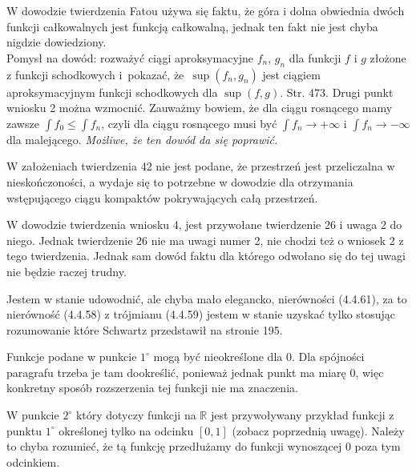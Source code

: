 \documentclass[a4paper,11pt]{article}
\begin{document}
\start {} W dowodzie twierdzenia Fatou używa się faktu, że góra
i dolna obwiednia dwóch funkcji całkowalnych jest funkcją
całkowalną, jednak ten fakt nie jest chyba nigdzie dowiedziony.\\
Pomysł na dowód: rozważyć ciągi aproksymacyjne $f_{ n }$, $g_{ n }$
dla funkcji $f$ i $g$ złożone z funkcji schodkowych i~pokazać,
że~$\sup( f_{ n }, g_{ n } )$ jest ciągiem aproksymacyjnym funkcji
schodkowych dla $\sup( f, g )$. \start Str. 473. Drugi punkt wniosku 2
można wzmocnić. Zauważmy bowiem, że dla ciągu rosnącego mamy zawsze
$\int f_{ 0 } \leq \int f_{ n }$, czyli dla ciągu rosnącego musi być
$\int f_{ n } \to +\infty$ i $\int f_{ n } \to -\infty$ dla
malejącego. \emph{Możliwe, że ten dowód da się poprawić.}

\vspace{\spaceFour}


\start {} W założeniach twierdzenia 42 nie jest podane, że
przestrzeń jest przeliczalna w nieskończoności, a wydaje się to
potrzebne w dowodzie dla otrzymania wstępującego ciągu kompaktów
pokrywających całą przestrzeń.

\vspace{\spaceFour}


\start {} W dowodzie twierdzenia wniosku 4, jest przywołane
twierdzenie 26 i uwaga 2 do niego. Jednak twierdzenie 26 nie ma uwagi
numer 2, nie chodzi też o wniosek 2 z tego twierdzenia. Jednak sam
dowód faktu dla którego odwołano się do tej uwagi nie będzie raczej
trudny.

\vspace{\spaceFour}


\start {} Jestem w stanie udowodnić, ale chyba mało elegancko,
nierówności (4.4.61), za to nierówność (4.4.58) z trójmianu (4.4.59)
jestem w stanie uzyskać tylko stosując rozumowanie które Schwartz
przedstawił na stronie 195.

\vspace{\spaceFour}


\start {} Funkcje podane w punkcie $1^{ \circ }$ mogą być
nieokreślone dla 0. Dla spójności paragrafu trzeba je tam dookreślić,
ponieważ jednak punkt ma miarę 0, więc konkretny sposób rozszerzenia
tej funkcji nie ma znaczenia.

\vspace{\spaceFour}


\start {} W punkcie $2^{ \circ }$ który dotyczy funkcji na
$\mathbb{R}$ jest przywoływany przykład funkcji z punktu $1^{ \circ }$
określonej tylko na odcinku $[ 0, 1 ]$ (zobacz poprzednią uwagę).
Należy to chyba rozumieć, że tą funkcję przedłużamy do funkcji
wynoszącej 0 poza tym odcinkiem.
\end{document}
